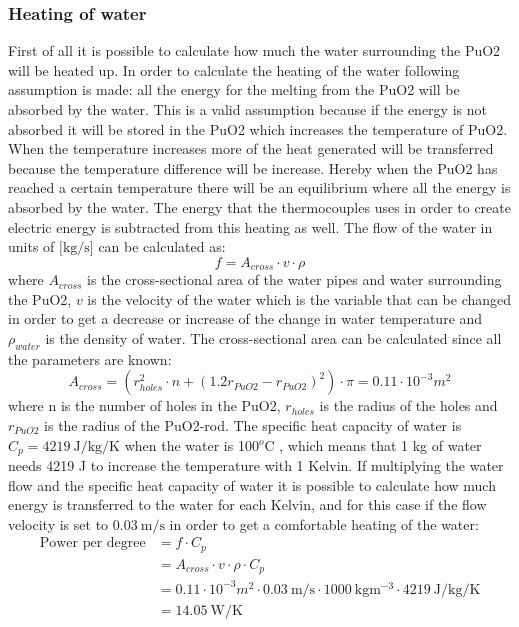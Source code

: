 \subsubsection{Heating of water}
First of all it is possible to calculate how much the water surrounding the PuO2 will be heated up. In order to calculate the heating of the water following assumption is made: all the energy for the melting from the PuO2 will be absorbed by the water. This is a valid assumption because if the energy is not absorbed it will be stored in the PuO2 which increases the temperature of PuO2. When the temperature increases more of the heat generated will be transferred because the temperature difference will be increase. Hereby when the PuO2 has reached a certain temperature there will be an equilibrium where all the energy is absorbed by the water. The energy that the thermocouples uses in order to create electric energy is subtracted from this heating as well.
The flow of the water in units of $\text{[kg/s]}$ can be calculated as: 
\begin{equation}
f = A_{cross} \cdot v \cdot \rho
\end{equation}
where $A_{cross}$ is the cross-sectional area of the water pipes and water surrounding the PuO2, $v$ is the velocity of the water which is the variable that can be changed in order to get a decrease or increase of the change in water temperature and $\rho_{water}$ is the density of water. The cross-sectional area can be calculated since all the parameters are known: 
\begin{equation}
A_{cross} = \left(r_{holes}^2 \cdot n + \left(1.2r_{PuO2}-r_{PuO2}\right) ^2 \right) \cdot \pi = 0.11 \cdot 10^{-3} m^2
\end{equation}
where n is the number of holes in the PuO2, $r_{holes}$ is the radius of the holes and $r_{PuO2}$ is the radius of the PuO2-rod.  The specific heat capacity of water is $C_p = \SI{4219}{\J\per\kg\per\K}$ when the water is 100$^o$C \cite{website:water_dens}, which means that 1 kg of water needs 4219 J to increase the temperature with 1 Kelvin. If multiplying the water flow and the specific heat capacity of water it is possible to calculate how much energy is transferred to the water for each Kelvin, and for this case if the flow velocity is set to $\SI{0.03}{\m\per\s}$ in order to get a comfortable heating of the water: 
\begin{equation}\label{eq:waterheating}
\begin{aligned}
\text{Power per degree} & ={} f \cdot C_p \\
& = A_{cross} \cdot v \cdot \rho \cdot C_p \\
& = 0.11\cdot 10^{-3} m^2 \cdot \SI{0.03}{\m\per\s} \cdot \SI{1000}{\kg\m^{-3}} \cdot \SI{4219}{\J\per\kg\per\K} \\
& = \SI{14.05} {\W\per\K} 
\end{aligned}
\end{equation}
